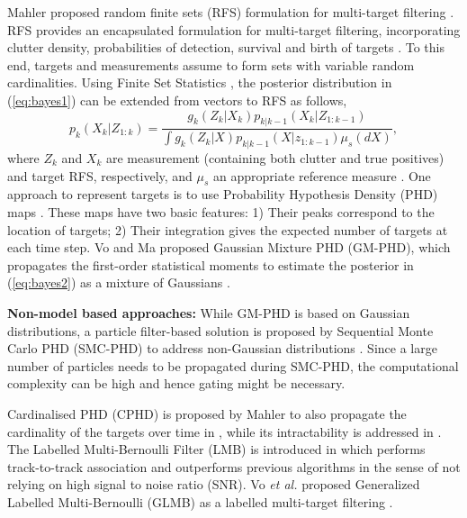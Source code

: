 \documentclass[runningheads]{llncs}
\begin{document}
Mahler proposed random finite sets (RFS) formulation for multi-target filtering \cite{Mahler:2003}. RFS provides an encapsulated formulation for multi-target filtering, incorporating clutter density, probabilities of detection, survival and birth of targets \cite{Vo:2005,Mahler:2003,Mahler:2007}. To this end, targets and measurements assume to form sets with variable random cardinalities. Using Finite Set Statistics \cite{Mahler:2003}, the posterior distribution in (\ref{eq:bayes1}) can be extended from vectors to RFS as follows,
\begin{equation}
p_k(X_k|Z_{1:k}) = \frac{g_k(Z_k|X_k)p_{k|k-1}(X_k|Z_{1:k-1})}{\int g_k(Z_k|X)p_{k|k-1}(X|z_{1:k-1})\mu_s(dX)},
\label{eq:bayes2}
\end{equation} 
\noindent where $Z_k$ and $X_k$ are measurement (containing both clutter and true positives) and target RFS, respectively, and $\mu_s$ an appropriate reference measure \cite{Vo:2006}. 
One approach to represent targets is to use Probability Hypothesis Density (PHD) maps \cite{Vo:2005,Vo:2006}. These maps have two basic features: 1) Their peaks correspond to the location of targets; 2) Their integration gives the expected number of targets at each time step. {Vo and Ma proposed Gaussian Mixture PHD (GM-PHD), which propagates the first-order statistical moments to estimate the posterior in (\ref{eq:bayes2}) as a mixture of Gaussians \cite{Vo:2006}.}

\noindent \textbf{{Non-model based approaches:}}
While GM-PHD is based on Gaussian distributions, a particle filter-based solution is proposed by Sequential Monte Carlo PHD (SMC-PHD) to address non-Gaussian distributions \cite{Vo:2003}. 
Since a large number of particles needs to be propagated during SMC-PHD, the computational complexity can be high and hence gating might be necessary.

Cardinalised PHD (CPHD) is proposed by Mahler to also propagate the cardinality of the targets over time in \cite{Mahler:2007}, while its intractability is addressed in \cite{Nagappa:2017}. 
The Labelled Multi-Bernoulli Filter (LMB) is introduced in \cite{Reuter:2014} which performs track-to-track association and outperforms previous algorithms in the sense of not relying on high signal to noise ratio (SNR). 
Vo \emph{et al.} proposed Generalized Labelled Multi-Bernoulli (GLMB) as a labelled multi-target filtering \cite{Vo:2014}. 
\end{document}

